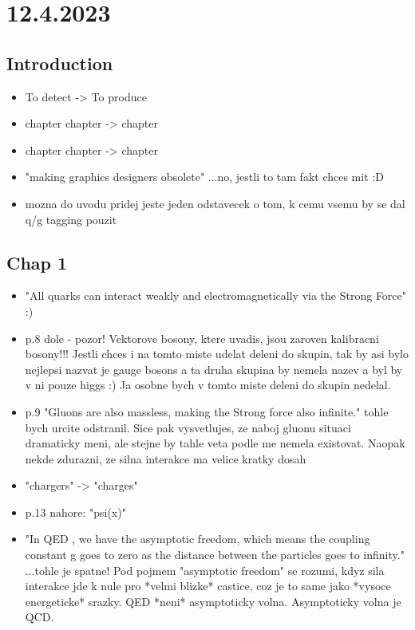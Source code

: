 
\section{12.4.2023}

\subsection{Introduction}
\begin{itemize} 
\item To detect -> To produce
\item chapter chapter -> chapter
\item chapter chapter -> chapter
\item "making graphics designers obsolete" ...no, jestli to tam fakt chces 
mit :D
\item mozna do uvodu pridej jeste jeden odstavecek o tom, k cemu vsemu by se 
dal q/g tagging pouzit 
\end{itemize}

\subsection{Chap 1}
\begin{itemize} 
\item "All quarks can interact weakly and electromagnetically via the Strong 
Force" :)
\item p.8 dole - pozor! Vektorove bosony, ktere uvadis, jsou zaroven 
kalibracni bosony!!! Jestli chces i na tomto miste udelat deleni do 
skupin, tak by asi bylo nejlepsi nazvat je gauge bosons a ta druha 
skupina by nemela nazev a byl by v ni pouze higgs :) Ja osobne bych v 
tomto miste deleni do skupin nedelal.
\item p.9 "Gluons are also massless, making the Strong force also infinite." 
tohle bych urcite odstranil. Sice pak vysvetlujes, ze naboj gluonu 
situaci dramaticky meni, ale stejne by tahle veta podle me nemela 
existovat. Naopak nekde zdurazni, ze silna interakce ma velice kratky dosah
\item "chargers" -> "charges"
\item p.13 nahore: "psi(x)"
\item "In QED , we have the asymptotic freedom, which means the coupling 
constant g goes to zero as the distance between the particles goes to 
infinity." ...tohle je spatne! Pod pojmem "asymptotic freedom" se 
rozumi, kdyz sila interakce jde k nule pro *velmi blizke* castice, coz 
je to same jako *vysoce energeticke* srazky. QED *neni* asymptoticky 
volna. Asymptoticky volna je QCD.
\end{itemize}

